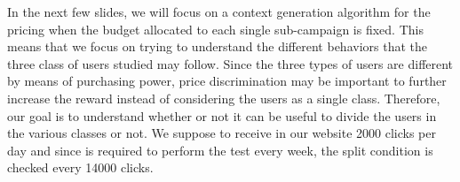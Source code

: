 In the next few slides, we will focus on a context generation algorithm for the pricing when the budget allocated to each single sub-campaign is fixed. This means that we focus on trying to understand the different behaviors that the three class of users studied may follow. Since the three types of users are different by means of purchasing power, price discrimination may be important to further increase the reward instead of considering the users as a single class. Therefore, our goal is to understand whether or not it can be useful to divide the users in the various classes or not.
We suppose to receive in our website 2000 clicks per day and since is required to perform the test every week, the split condition is checked every 14000 clicks.
